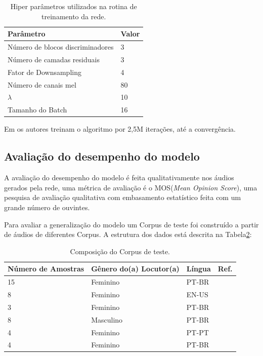 \documentclass{article}
\begin{document}
\begin{table}[H]
	\centering
	\begin{tabular}{|l|l|}
		\hline
		Parâmetro & Valor \\ \hline
		Número de blocos discriminadores & 3 \\ \hline
		Número de camadas residuais & 3 \\ \hline
		Fator de Downsampling & 4 \\ \hline
		Número de canais mel & 80 \\ \hline
		$\lambda$ & 10 \\ \hline
		Tamanho do Batch & 16 \\ \hline
	\end{tabular}
	\caption{Hiper parâmetros utilizados na rotina de treinamento da rede.}
	\label{tab:hiperparams}
\end{table}

Em \cite{melgan} os autores treinam o algoritmo por 2,5M iterações, até a convergência. 

\subsection{Avaliação do desempenho do modelo}

A avaliação do desempenho do modelo é feita qualitativamente nos áudios gerados pela rede, uma métrica de avaliação é o MOS(\textit{Mean Opinion Score}), uma pesquisa de avaliação qualitativa com embasamento estatístico feita com um grande número de ouvintes. 

Para avaliar a generalização do modelo um Corpus de teste foi construído a partir de áudios de diferentes Corpus. A estrutura dos dados está descrita na Tabela\ref{tab:corpus}:

\begin{table}[H]
	\centering
	\begin{tabular}{|l|l|l|l|}
		\hline
		Número de Amostras & Gênero do(a) Locutor(a) & Língua & Ref. \\ \hline
		15 & Feminino & PT-BR & \cite{reliquia} \\ \hline
		8 & Feminino & EN-US & \cite{ljspeech} \\ \hline
		3 & Feminino & PT-BR & \cite{inglaterra} \\ \hline
		8 & Masculino & PT-BR & \cite{inglaterra} \\ \hline
		4 & Feminino & PT-PT & \cite{contos} \\ \hline
		4 & Feminino & PT-BR & \cite{defunto} \\ \hline
	\end{tabular}
	\caption{Composição do Corpus de teste.}
	\label{tab:corpus}
\end{table}
\end{document}
